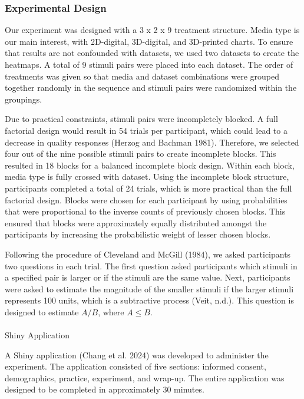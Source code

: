 \documentclass[
  letterpaper,
  DIV=11,
  numbers=noendperiod]{scrartcl}
\makeatletter
\let\oldparagraph\paragraph
\renewcommand{\paragraph}{
    \@ifstar
      \xxxParagraphStar
      \xxxParagraphNoStar
  }
\newcommand{\xxxParagraphStar}[1]{\oldparagraph*{#1}\mbox{}}
\newcommand{\xxxParagraphNoStar}[1]{\oldparagraph{#1}\mbox{}}
\makeatother
\begin{document}
\subsubsection{Experimental Design}\label{experimental-design}

Our experiment was designed with a 3 x 2 x 9 treatment structure. Media
type is our main interest, with 2D-digital, 3D-digital, and 3D-printed
charts. To ensure that results are not confounded with datasets, we used
two datasets to create the heatmaps. A total of 9 stimuli pairs were
placed into each dataset. The order of treatments was given so that
media and dataset combinations were grouped together randomly in the
sequence and stimuli pairs were randomized within the groupings.

Due to practical constraints, stimuli pairs were incompletely blocked. A
full factorial design would result in 54 trials per participant, which
could lead to a decrease in quality responses (Herzog and Bachman 1981).
Therefore, we selected four out of the nine possible stimuli pairs to
create incomplete blocks. This resulted in 18 blocks for a balanced
incomplete block design. Within each block, media type is fully crossed
with dataset. Using the incomplete block structure, participants
completed a total of 24 trials, which is more practical than the full
factorial design. Blocks were chosen for each participant by using
probabilities that were proportional to the inverse counts of previously
chosen blocks. This ensured that blocks were approximately equally
distributed amongst the participants by increasing the probabilistic
weight of lesser chosen blocks.

Following the procedure of Cleveland and McGill (1984), we asked
participants two questions in each trial. The first question asked
participants which stimuli in a specified pair is larger or if the
stimuli are the same value. Next, participants were asked to estimate
the magnitude of the smaller stimuli if the larger stimuli represents
100 units, which is a subtractive process (Veit, n.d.). This question is
designed to estimate \(A/B\), where \(A\leq B\).

\paragraph{Shiny Application}\label{shiny-application}

A Shiny application (Chang et al. 2024) was developed to administer the
experiment. The application consisted of five sections: informed
consent, demographics, practice, experiment, and wrap-up. The entire
application was designed to be completed in approximately 30 minutes.
\end{document}

